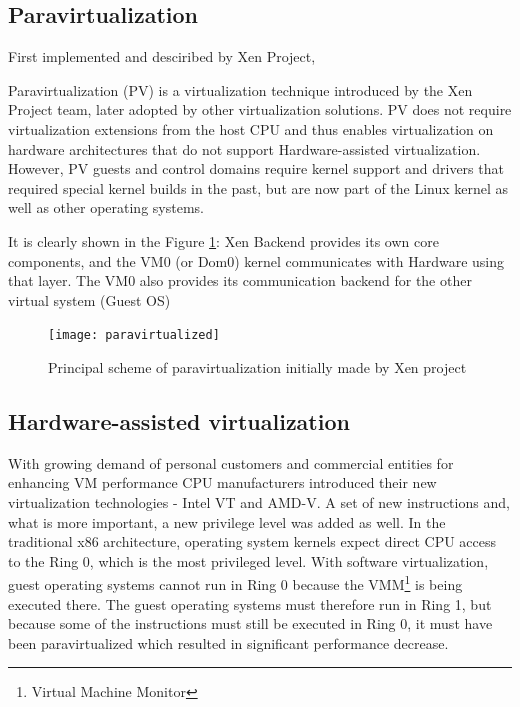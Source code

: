 \subsection{Paravirtualization}

First implemented and desciribed by Xen Project,

\begin{definition}
Paravirtualization (PV) is a virtualization technique
introduced by the Xen Project team, later adopted by other
virtualization solutions. PV does not require virtualization extensions from
the host CPU and thus enables virtualization on hardware architectures that do
not support Hardware-assisted virtualization.
However, PV guests and control domains require kernel
support and drivers that required special kernel builds in the past,
but are now part of the Linux kernel as well as other
operating systems\cite{ParavirtualizationDefinition}.
\end{definition}

It is clearly shown in the Figure \ref{fig:ParavirtualizationPic}:
Xen Backend provides its own core components, and the VM0 (or Dom0)
kernel communicates
with Hardware using that layer. The VM0 also provides
its communication backend for the other virtual system (Guest OS)
\begin{figure}
\texttt{[image: paravirtualized]}
\caption{Principal scheme of paravirtualization initially made by Xen project}
\cite{ParavirtualizationPic}
\label{fig:ParavirtualizationPic}
\end{figure}

\subsection{Hardware-assisted virtualization}

With growing demand of personal customers
and commercial entities for enhancing VM performance
CPU manufacturers introduced
their new virtualization technologies - Intel VT and AMD-V.
A set of new instructions and, what is more important, a new privilege level
was added as well.
In the traditional x86 architecture,
operating system kernels expect direct CPU access
to the Ring 0, which is the most privileged level.
With software virtualization, guest operating
systems cannot run in Ring 0 because
the VMM\footnote{Virtual Machine Monitor} is being executed there.
The guest operating systems must therefore run in Ring 1,
but because some of the instructions must still be executed in Ring 0,
it must have been paravirtualized which resulted
in significant performance decrease\cite{HWAssistedVirt}.

